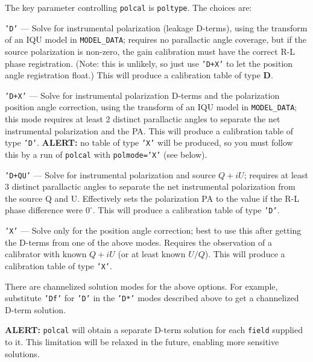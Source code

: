 The key parameter controlling {\tt polcal} is {\tt poltype}.  The
choices are:
\begin{description}
\item{\tt 'D'} --- Solve for instrumental polarization (leakage D-terms),
using the transform of an IQU model in {\tt MODEL\_DATA}; requires no
parallactic angle coverage, but if the source polarization is non-zero,
the gain calibration must have the correct R-L phase registration.
(Note: this is unlikely, so just use {\tt 'D+X'} to let the position
angle registration float.) This will produce a calibration table of
type {\bf D}.

\item{\tt 'D+X'} --- Solve for instrumental polarization D-terms and
the polarization position angle correction, using the transform of an
IQU model in {\tt MODEL\_DATA}; this mode requires at least 2 distinct
parallactic angles to separate the net instrumental polarization and
the PA. This will produce a calibration table of
type {\tt 'D'}. {\bf ALERT:} no table of type {\tt 'X'} will be
produced, so you must follow this by a run of {\tt polcal} with
{\tt polmode='X'} (see below).

\item{\tt 'D+QU'} --- Solve for instrumental polarization and source 
$Q+iU$; requires at least 3 distinct parallactic angles to separate
the net instrumental polarization from the source Q and U.
Effectively sets the polarization PA to the value if the R-L phase
difference were $0^\circ$.  This will produce a calibration table of
type {\tt 'D'}. 

\item{\tt 'X'} --- Solve only for the position angle correction; best to use
this after getting the D-terms from one of the above modes.  Requires
the observation of a calibrator with known $Q+iU$ (or at least known $U/Q$).
This will produce a calibration table of type {\tt 'X'}. 

\end{description}

There are channelized solution modes for the above options.  For
example, substitute {\tt 'Df'} for {\tt 'D'} in the {\tt 'D*'} modes 
described above to get a channelized D-term solution.  

{\bf ALERT:} {\tt polcal} will obtain a separate D-term solution for
each {\tt field} supplied to it.  This limitation will be relaxed in 
the future, enabling more sensitive solutions.


